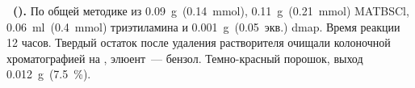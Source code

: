 \textbf{~().} 
По общей методике из \SI{0.09}{\gram}~(\SI{0.14}{\milli\mole}), \SI{0.11}{\gram}~(\SI{0.21}{\milli\mole}) MATBSCl, \SI{0.06}{\milli\litre}~(\SI{0.4}{\milli\mole}) триэтиламина и \SI{0.001}{\gram}~(0.05~экв.) \ac{dmap}. 
Время реакции 12 часов. Твердый остаток после удаления растворителя очищали колоночной хроматографией на , элюент~--- бензол.
Темно-красный порошок, выход \SI{0.012}{\gram}~(\SI{7.5}{\percent}).